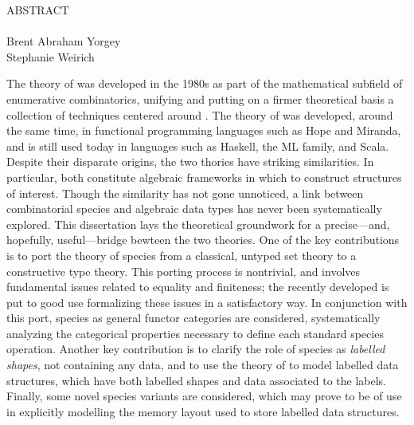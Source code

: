 
\begin{doublespace}

\begin{centering}
{\Large ABSTRACT} \\
\Title \\
Brent Abraham Yorgey \\
Stephanie Weirich \\
\end{centering}

\vspace*{1in}

The theory of  was developed in the 1980s
as part of the mathematical subfield of enumerative combinatorics,
unifying and putting on a firmer theoretical basis a collection of
techniques centered around .  The theory of
 was developed, around the same time, in
functional programming languages such as Hope and Miranda, and is
still used today in languages such as Haskell, the ML family, and
Scala.  Despite their disparate origins, the two thories have striking
similarities. In particular, both constitute algebraic frameworks in
which to construct structures of interest.  Though the similarity has
not gone unnoticed, a link between combinatorial species and algebraic
data types has never been systematically explored.  This dissertation
lays the theoretical groundwork for a precise---and, hopefully,
useful---bridge bewteen the two theories.  One of the key
contributions is to port the theory of species from a classical,
untyped set theory to a constructive type theory. This porting process
is nontrivial, and involves fundamental issues related to equality and
finiteness; the recently developed  is put
to good use formalizing these issues in a satisfactory way.  In
conjunction with this port, species as general functor categories are
considered, systematically analyzing the categorical properties
necessary to define each standard species operation.  Another key
contribution is to clarify the role of species as \emph{labelled
  shapes}, not containing any data, and to use the theory of
 to model labelled data structures, which have
both labelled shapes and data associated to the labels.  Finally, some
novel species variants are considered, which may prove to be of use in
explicitly modelling the memory layout used to store labelled data
structures.

\end{doublespace}
